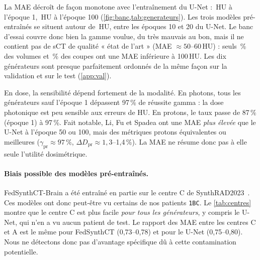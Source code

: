 \documentclass[11pt,a4paper]{article}
\newcommand{\tablefile}[1]{{\footnotesize\setlength{\tabcolsep}{4pt}\adjustbox{max width=\textwidth}{}}}
\begin{document}
\begin{table}[t]
\centering
\caption{Qualité moyenne des générateurs sur le test (27 patients). MAE : moyenne $\pm$ écart-type. $\gamma$ : taux de réussite gamma 2\,\%/2\,mm ; $\Delta D$ : écart de dose moyen ; $\Delta D98$ : écart absolu de D98 de la cible ; ph = photons, pr = protons. Les mêmes chiffres sur la validation figurent en \cref{app:val}.}
\label{tab:generateurs}
\tablefile{generateurs_test}
\end{table}

La MAE décroît de façon monotone avec l'entraînement du U-Net : \maeEpOne{}\,HU à l'époque 1, \maeEpHundred{}\,HU à l'époque 100 (\cref{fig:banc,tab:generateurs}). Les trois modèles pré-entraînés se situent autour de \maeFedsynth{}\,HU, entre les époques 10 et 20 du U-Net. Le banc d'essai couvre donc bien la gamme voulue, du très mauvais au bon, mais il ne contient pas de sCT de qualité « état de l'art » (MAE $\approx 50$--60\,HU) : seuls \pctAcceptable{}\,\% des volumes et \pctAcceptableSlices{}\,\% des coupes ont une MAE inférieure à 100\,HU. Les dix générateurs sont presque parfaitement ordonnés de la même façon sur la validation et sur le test (\cref{app:val}).

En dose, la sensibilité dépend fortement de la modalité. En photons, tous les générateurs sauf l'époque 1 dépassent 97\,\% de réussite gamma : la dose photonique est peu sensible aux erreurs de HU. En protons, le taux passe de 87\,\% (époque 1) à 97\,\%. Fait notable, Li, Fu et Spadea ont une MAE \emph{plus élevée} que le U-Net à l'époque 50 ou 100, mais des métriques protons équivalentes ou meilleures ($\gamma_\text{pr} \approx 97\,\%$, $\Delta D_\text{pr} \approx 1{,}3$--1,4\,\%). La MAE ne résume donc pas à elle seule l'utilité dosimétrique.

\paragraph{Biais possible des modèles pré-entraînés.} FedSynthCT-Brain a été entraîné en partie sur le centre C de SynthRAD2023~\cite{raggio2025fedsynth}. Ces modèles ont donc peut-être vu certains de nos patients \texttt{1BC}. Le \cref{tab:centres} montre que le centre C est plus facile \emph{pour tous les générateurs}, y compris le U-Net, qui n'en a vu aucun patient de test. Le rapport des MAE entre les centres C et A est le même pour FedSynthCT (0,73--0,78) et pour le U-Net (0,75--0,80). Nous ne détectons donc pas d'avantage spécifique dû à cette contamination potentielle.
\end{document}
